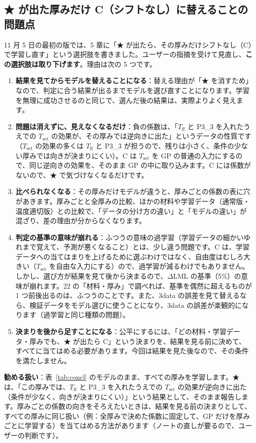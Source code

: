 \documentclass[paper=a4paper,fontsize=10.5pt,line_length=44zw,number_of_lines=40]{jlreq}
\newcommand{\Tff}{T_{\mathrm{ff}}}
\newcommand{\Tset}{T_{\mathrm{set}}}
\let\origtextbf\textbf
\renewcommand{\textbf}[1]{\origtextbf{\gtfamily #1}}   %
\begin{document}
\subsection{★ が出た厚みだけ C（シフトなし）に替えることの問題点}\label{sec:noc}
11 月 5 日の最初の版では、5 章に「★ が出たら、その厚みだけシフトなし（C）で学習し直す」という選択肢を書きました。ユーザーの指摘を受けて見直し、\textbf{この選択肢は取り下げます}。理由は次の 5 つです。
\begin{enumerate}[itemsep=0.5ex,topsep=0.4ex]
\item \textbf{結果を見てからモデルを替えることになる}：替える理由が「★ を消すため」なので、判定に合う結果が出るまでモデルを選び直すことになります。学習を無理に成功させるのと同じで、選んだ後の結果は、実際よりよく見えます。
\item \textbf{問題は消えずに、見えなくなるだけ}：負の係数は、「$\Tff$ と P3\_3 を入れたうえでの $\Tset$ の効果が、その厚みでは逆向きに出た」というデータの性質です（$\Tset$ の効果の多くは $\Tff$ と P3\_3 が担うので、残りは小さく、条件の少ない厚みでは向きが決まりにくい）。C は $\Tset$ を GP の普通の入力にするので、同じ逆向きの効果を、そのまま GP の中に取り込みます。C には係数がないので、★ で気づけなくなるだけです。
\item \textbf{比べられなくなる}：その厚みだけモデルが違うと、厚みごとの係数の表に穴があきます。厚みごとと全厚みの比較、ほかの材料や学習データ（通常版・温度適切版）との比較で、「データの分け方の違い」と「モデルの違い」が混ざり、差の理由が分からなくなります。
\item \textbf{判定の基準の意味が崩れる}：ふつうの意味の過学習（学習データの細かいゆれまで覚えて、予測が悪くなること）とは、少し違う問題です。C は、学習データへの当てはまりを上げるために選ぶわけではなく、自由度はむしろ大きい（$\Tset$ を自由な入力にする）ので、過学習が減るわけでもありません。しかし、選び方が結果を見て後から決まるので、$\Delta$LML の基準（5\%）の意味が崩れます。22 の「材料・厚み」で調べれば、基準を偶然に超えるものが 1 つ前後出るのは、ふつうのことです。また、3data の誤差を見て替えるなら、検証データをモデル選びに使うことになり、3data の誤差が楽観的になります（過学習と同じ種類の問題）。
\item \textbf{決まりを後から足すことになる}：公平にするには、「どの材料・学習データ・厚みでも、★ が出たら C」という決まりを、結果を見る前に決めて、すべてに当てはめる必要があります。今回は結果を見た後なので、その条件を満たしません。
\end{enumerate}
\textbf{勧める扱い}：表~\ref{tab:concl} のモデルのまま、すべての厚みを学習します。★ は、「この厚みでは、$\Tff$ と P3\_3 を入れたうえでの $\Tset$ の効果が逆向きに出た（条件が少なく、向きが決まりにくい）」という結果として、そのまま報告します。厚みごとの係数の向きをそろえたいときは、結果を見る前の決まりとして、すべての厚みに同じ扱い（例：全厚みで決めた係数に固定して、GP だけを厚みごとに学習する）を当てはめる方法があります（ノートの直しが要るので、ユーザーの判断です）。
\end{document}
